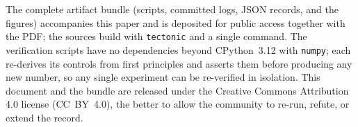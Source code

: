 \documentclass[11pt,a4paper]{article}
\numberwithin{equation}{section}
\theoremstyle{plain}
\theoremstyle{definition}
\theoremstyle{remark}
\begin{document}
The complete artifact bundle (scripts, committed logs, JSON records, and
the figures) accompanies this paper and is deposited for public access
together with the PDF; the sources build with \texttt{tectonic} and a
single command. The verification scripts have no dependencies beyond
CPython~3.12 with \texttt{numpy}; each re-derives its controls from
first principles and asserts them before producing any new number, so
any single experiment can be re-verified in isolation. This document and the
bundle are released under the Creative Commons
Attribution 4.0 license (CC~BY~4.0), the better to allow the community
to re-run, refute, or extend the record.


\end{document}

